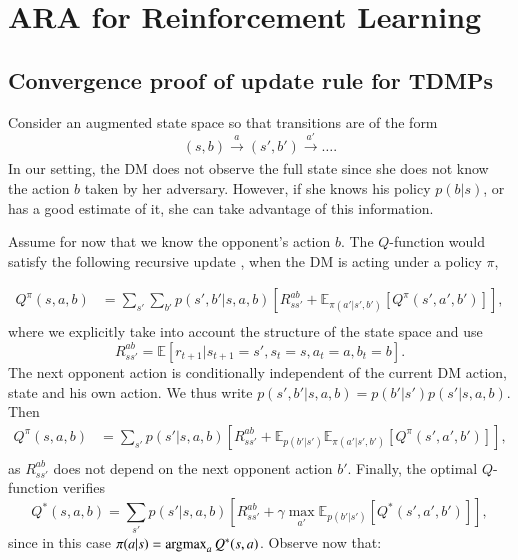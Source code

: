 \chapter{ARA for Reinforcement Learning}

\section{Convergence proof of update rule for TDMPs}\label{sec:p}

Consider an augmented state space so that transitions are of the form
$$
 (s,b) \xrightarrow[]{a} (s',b') \xrightarrow[]{a'} \ldots.
$$
In our setting, the DM does not observe the full state since she does
not know the action $b$ taken by her adversary. However, if she knows his policy $p(b|s)$, or has a good estimate of it, she can take advantage of this information.

Assume for now that we know the opponent's action $b$. The $Q$-function would satisfy the following recursive update \cite{sutton2012reinforcement}, when the DM is acting under a policy $\pi$,

\begin{eqnarray*}
Q^\pi (s,a,b) &=  \sum_{s'} \sum_{b'} p(s', b' |s,a,b) \left[ R_{ss'}^{ab} +  \mathbb{E}_{\pi(a'|s',b')} \left[ Q^\pi(s',a',b') \right] \right],\\
\end{eqnarray*}
where we explicitly take into account the structure of the state space and 
use 
$$
R_{ss'}^{ab} = \mathbb{E}\left[ r_{t+1}|s_{t+1} = s', s_{t} = s, a_t = a, b_t = b \right].
$$ 
The next opponent action is conditionally independent of the 
current DM action, state and his own action. We thus write $p(s', b' |s,a,b) = p(b'|s')p(s'|s,a,b)$. Then
\begin{eqnarray*}
Q^\pi (s,a,b) &=  \sum_{s'} p(s'|s,a,b) \left[ R_{ss'}^{ab} +  \mathbb{E}_{p(b'|s')} \mathbb{E}_{\pi(a'|s',b')} \left[ Q^\pi(s',a',b') \right] \right],\\
\end{eqnarray*}
as $R_{ss'}^{ab}$ does not depend on the next opponent action $b'$. Finally, the optimal $Q$-function verifies
$$
Q^*(s,a,b) =  \sum_{s'} p(s'|s,a,b) \left[ R_{ss'}^{ab} + \gamma \max_{a'} \mathbb{E}_{p(b'|s')} \left[ Q^*(s',a',b') \right] \right],
$$
since in this case $\pi(a|s) = \operatorname*{argmax}_a Q^*(s,a)$. Observe now that:

